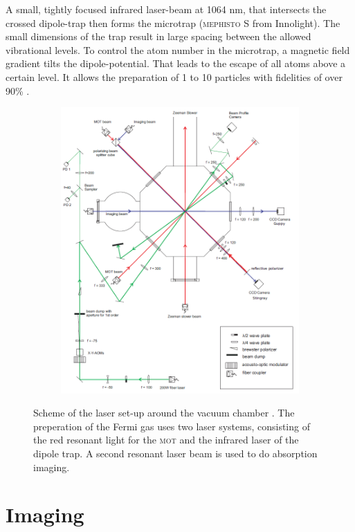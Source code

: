  A small, tightly focused infrared laser-beam at 1064 nm, that intersects the crossed dipole-trap then forms the microtrap (\textsc{mephisto S} from Innolight). The small dimensions of the trap result in large spacing between the allowed vibrational levels. To control the atom number in the microtrap, a magnetic field gradient tilts the dipole-potential. That leads to the escape of all atoms above a certain level. It allows the preparation of 1 to 10 particles with fidelities of over 90\% \cite{preparation}.	 
\begin{figure}[h]
\centering
\begin{subfigure}[b]{0.8\textwidth}
                \includegraphics[width=\textwidth]{scheme}
\end{subfigure}
\caption{Scheme of the laser set-up around the vacuum chamber \cite{lompe}. The preperation of the Fermi gas uses two laser systems, consisting of the red resonant light for the \textsc{mot} and the infrared laser of the dipole trap. A second resonant laser beam is used to do absorption imaging.}
\label{scheme}
\end{figure}
\section{Imaging}

